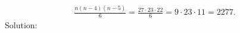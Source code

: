 \begin{align*}
\frac{n(n-4)(n-5)}{6}
=
\frac{27 \cdot 23 \cdot 22}{6}
=
9 \cdot 23 \cdot 11
=
2277.
\end{align*}
Solution: 